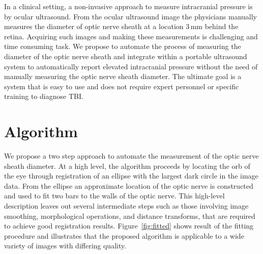 \documentclass{llncs}
\begin{document}
In a clinical setting, a non-invasive approach to measure intracranial pressure is
by ocular ultrasound. From the ocular ultrasound image the physicians manually
measures the diameter of optic nerve sheath at a location 3\,mm behind the retina.
Acquiring such images and making these measurements is challenging and time
consuming task. We propose to automate the process of measuring the diameter of
the optic nerve sheath and integrate within a portable ultrasound system to
automatically report elevated intracranial pressure without the need of manually
measuring the optic nerve sheath diameter. The ultimate goal is a system that is
easy to use and does not require expert personnel or specific training to
diagnose TBI.    

\section{Algorithm}
We propose a two step approach to automate the measurement of the optic nerve
sheath diameter. At a high level, the algorithm proceeds by locating the orb of
the eye through registration of an ellipse with the largest dark circle in the
image data. From the ellipse an approximate location of the optic nerve is
constructed and used to fit two bars to the walls of the optic nerve. This
high-level description leaves out several intermediate steps such as those
involving image smoothing, morphological operations, and distance transforms,
that are required to achieve good registration results. Figure~\ref{fig:fitted}
shows result of the fitting procedure and illustrates that the proposed
algorithm is applicable to a wide variety of images with differing quality.
\end{document}

